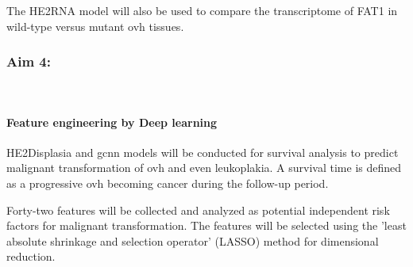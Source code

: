 \documentclass[12pt, a4paper]{article}
\begin{document}
The HE2RNA model will also be used to compare the transcriptome of FAT1 in wild-type versus mutant \acrshort{ovh} tissues.








\clearpage
\subsubsection*{Aim 4:}\\[0.5cm]


\paragraph{Feature engineering by Deep learning}




HE2Displasia and \acrfull{gcnn} models will be conducted for survival analysis to predict malignant transformation of \acrshort{ovh} and even leukoplakia.
A survival time is defined as a progressive \acrshort{ovh} becoming cancer during the follow-up period.


Forty-two features will be collected and analyzed as potential independent risk factors for malignant transformation. 
The features will be selected using the 'least absolute shrinkage and selection operator' (LASSO) method for dimensional reduction.
\end{document}
